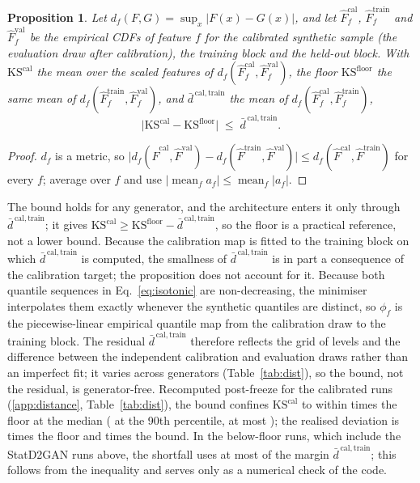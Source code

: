 \documentclass[preprint,12pt]{elsarticle}
\newtheorem{proposition}{Proposition}
\begin{document}
\begin{proposition}\label{prop:lock}
Let $d_f(F,G)=\sup_x\lvert F(x)-G(x)\rvert$, and let $\hat F_f^{\mathrm{cal}}$,
$\hat F_f^{\mathrm{train}}$ and $\hat F_f^{\mathrm{val}}$ be the empirical CDFs
of feature $f$ for the calibrated synthetic sample (the evaluation draw after
calibration), the training block and the
held-out block. With $\mathrm{KS}^{\mathrm{cal}}$ the mean over the \protoNScaledWord{} scaled
features of $d_f(\hat F_f^{\mathrm{cal}},\hat F_f^{\mathrm{val}})$, the floor
$\mathrm{KS}^{\mathrm{floor}}$ the same mean of
$d_f(\hat F_f^{\mathrm{train}},\hat F_f^{\mathrm{val}})$, and
$\bar d^{\,\mathrm{cal,train}}$ the mean of
$d_f(\hat F_f^{\mathrm{cal}},\hat F_f^{\mathrm{train}})$,
\[
  \bigl\lvert \mathrm{KS}^{\mathrm{cal}}-\mathrm{KS}^{\mathrm{floor}}\bigr\rvert
  \;\le\; \bar d^{\,\mathrm{cal,train}} .
\]
\end{proposition}
\begin{proof}
$d_f$ is a metric, so $\lvert d_f(\hat F^{\mathrm{cal}},\hat F^{\mathrm{val}})
- d_f(\hat F^{\mathrm{train}},\hat F^{\mathrm{val}})\rvert \le
d_f(\hat F^{\mathrm{cal}},\hat F^{\mathrm{train}})$ for every $f$; average over
$f$ and use $\lvert \operatorname{mean}_f a_f\rvert\le\operatorname{mean}_f\lvert a_f\rvert$.
\end{proof}
The bound holds for any generator, and the architecture enters it only through
$\bar d^{\,\mathrm{cal,train}}$; it gives
$\mathrm{KS}^{\mathrm{cal}}\ge\mathrm{KS}^{\mathrm{floor}}-\bar d^{\,\mathrm{cal,train}}$,
so the floor is a practical reference, not a lower bound.  Because the
calibration map is fitted to the training block on which
$\bar d^{\,\mathrm{cal,train}}$ is computed, the smallness of
$\bar d^{\,\mathrm{cal,train}}$ is in part a consequence of the calibration
target; the proposition does not account for it.  Because both quantile
sequences in Eq.~\eqref{eq:isotonic} are non-decreasing, the minimiser
interpolates them exactly whenever the synthetic quantiles are distinct, so
$\phi_f$ is the piecewise-linear empirical quantile map from the calibration
draw to the training block.  The residual $\bar d^{\,\mathrm{cal,train}}$
therefore reflects the grid of \protoNQuantiles{} levels and the difference
between the independent calibration and evaluation draws rather than an
imperfect fit; it varies across generators (Table~\ref{tab:dist}), so the
bound, not the residual, is generator-free.  Recomputed post-freeze for the \phDistNRuns{}
calibrated runs (\ref{app:distance}, Table~\ref{tab:dist}), the bound
confines $\mathrm{KS}^{\mathrm{cal}}$ to within \phDistRatioMed{} times the floor
at the median (\phDistRatioPninety{} at the 90th percentile, at most
\phDistTopOneRatio{}); the realised deviation is \phDistGapMed{} times the floor
and \phDistGapOverDMed{} times the bound.  In the \phDistBelowAll{} below-floor
runs, which include the \phKsRatioCellsBelowOne{} StatD2GAN runs above, the
shortfall uses at most \phDistBelowMaxRatio{} of the margin
$\bar d^{\,\mathrm{cal,train}}$; this follows from the inequality and serves
only as a numerical check of the code.
\end{document}
